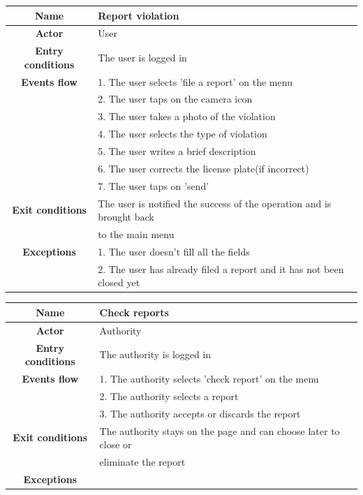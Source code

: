 \vspace{1.5cm}

\begin{flushleft}
\begin{tabular}{|c|l|}
\hline
    \textbf{Name} & Report violation\\ \hline
    \textbf{Actor} & User\\ \hline
    \textbf{Entry conditions} &  The user is logged in\\ \hline
    \textbf{Events flow} & 
    1. The user selects 'file a report' on the menu\\
    & 2. The user taps on the camera icon\\
    & 3. The user takes a photo of the violation\\
    & 4. The user selects the type of violation\\
    & 5. The user writes a brief description\\
    & 6. The user corrects the license plate(if incorrect)\\
    & 7. The user taps on 'send'\\ \hline
    \textbf{Exit conditions} 
    & The user is notified the success of the operation and is brought back\\ 
    & to the main menu\\ \hline
    \textbf{Exceptions} 
    & 1. The user doesn't fill all the fields\\
    & 2. The user has already filed a report and it has not been closed yet\\
\hline 
\end{tabular}
\end{flushleft}

\newpage

\begin{flushleft}
\begin{tabular}{|c|l|}
\hline
    \textbf{Name} & Check reports\\ \hline
    \textbf{Actor} & Authority\\ \hline
    \textbf{Entry conditions} &  The authority is logged in\\ \hline
    \textbf{Events flow} 
    & 1. The authority selects 'check report' on the menu\\
    & 2. The authority selects a report\\
    & 3. The authority accepts or discards the report\\ \hline
    \textbf{Exit conditions} 
    & The authority stays on the page and can choose later to close or\\
    & eliminate the report\\ \hline
    \textbf{Exceptions} & \\
\hline 
\end{tabular} 
\end{flushleft}

